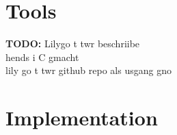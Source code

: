 \section{Tools}
\textbf{TODO: } Lilygo t twr beschriibe \\
hends i C gmacht \\
lily go t twr github repo als usgang gno 

\section{Implementation}


